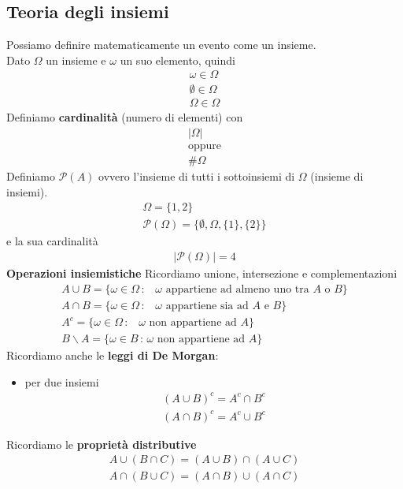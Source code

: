 \documentclass[a4paper,12pt]{article}
\begin{document}
\subsection{Teoria degli insiemi}
Possiamo definire matematicamente un evento come un insieme. \\
Dato $\Omega$ un insieme e $\omega$ un suo elemento, quindi
\begin{align*}
    \omega \in \Omega \\
    \emptyset \in \Omega \\
    \Omega \in \Omega
\end{align*}
Definiamo \textbf{cardinalità} (numero di elementi) con
\begin{align*}
    | \Omega | \\
    \text{oppure} \\
    \# \Omega
\end{align*}
Definiamo  $\mathcal{P}(A)$ ovvero l'insieme di tutti i sottoinsiemi di $\Omega$ (insieme di insiemi).
\begin{align*}
  \Omega = \{1,2\} \\
  \mathcal{P}(\Omega) = \{\emptyset, \Omega, \{1\}, \{2\} \}
\end{align*}
e la sua cardinalità
\begin{align*}
  | \mathcal{P}(\Omega) | = 4
\end{align*}
\textbf{Operazioni insiemistiche} Ricordiamo unione, intersezione e complementazioni
\begin{align*}
A \cup B = \{\omega \in \Omega \, : \, \text{ $\omega$ appartiene ad almeno uno tra $A$ o $B$} \} \\
A \cap B = \{\omega \in \Omega \, : \, \text{ $\omega$ appartiene sia ad $A$ e $B$} \} \\
A^c = \{\omega \in \Omega \, : \, \text{ $\omega$ non appartiene ad $A$}\} \\
B \backslash A = \{\omega \in B \, : \, \text{$\omega$ non appartiene ad $A$} \}
\end{align*}
Ricordiamo anche le \textbf{leggi di De Morgan}:
\begin{itemize}
  \item per due insiemi 
  \begin{align*}
  (A \cup B)^c = A^c \cap B^c \\
  (A \cap B)^c = A^c \cup B^c
  \end{align*}
\end{itemize}
Ricordiamo le \textbf{proprietà distributive}
\begin{align*}
  A \cup ( B \cap C) = (A \cup B) \cap (A \cup C) \\
  A \cap (B \cup C) = (A \cap B) \cup (A \cap C)
\end{align*}
\end{document}
